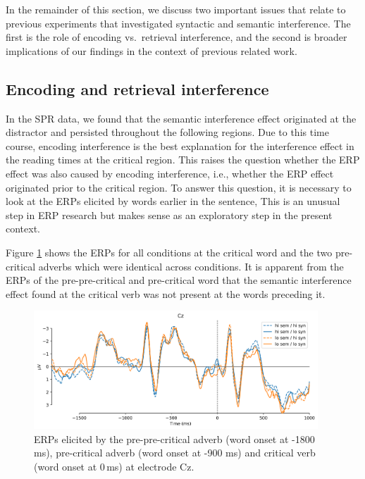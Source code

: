 \documentclass[a4paper, man, floatsintext]{apa7}
\begin{document}
In the remainder of this section, we discuss two important issues that relate to previous experiments that investigated syntactic and semantic interference. The first is the role of encoding vs.\ retrieval interference, and the second is broader implications of our findings in the context of previous related work.

\subsection{Encoding and retrieval interference}
In the SPR data, we found that the semantic interference effect originated at the distractor and persisted throughout the following regions. Due to this time course, encoding interference \parencite{Yadavetal2022,hammerly2019grammaticality} is the best explanation for the interference effect in the reading times at the critical region. This raises the question whether the ERP effect was also caused by encoding interference, i.e., whether the ERP effect originated prior to the critical region. To answer this question, it is necessary to look at the ERPs elicited by words earlier in the sentence, This is an unusual step in ERP research but makes sense as an exploratory step in the present context. 

Figure \ref{fig:erp_precrit} shows the ERPs for all conditions at the critical word and the two pre-critical adverbs which were identical across conditions. It is apparent from the ERPs of the pre-pre-critical and pre-critical word that the semantic interference effect found at the critical verb was not present at the words preceding it. 

\begin{figure}[H]
    \caption{ERPs elicited by the pre-pre-critical adverb (word onset at -1800 ms), pre-critical adverb (word onset at -900 ms) and critical verb (word onset at 0\,ms) at electrode Cz.}
    \label{fig:erp_precrit}
    \centering
    \includegraphics[width=0.95\textwidth]{images/N_103_Cz_precrit.png}
\end{figure}
\end{document}
